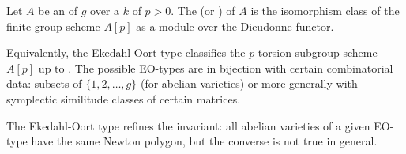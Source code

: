 \begin{definition} \label{definition:ekedahl_oort_type_of_abelian_variety_over_characteristic_p_field}
    Let $A$ be an  of  $g$ over a  $k$ of  $p > 0$. 
    The  (or ) of $A$ is the isomorphism class of the finite group scheme $A[p]$ as a module over the Dieudonne functor.

    Equivalently, the Ekedahl-Oort type classifies the $p$-torsion subgroup scheme $A[p]$ up to . The possible EO-types are in bijection with certain combinatorial data: subsets of $\{1, 2, \dots, g\}$ (for  abelian varieties) or more generally with symplectic similitude classes of certain matrices.

    The Ekedahl-Oort type refines the  invariant: all abelian varieties of a given EO-type have the same Newton polygon, but the converse is not true in general.
\end{definition}
